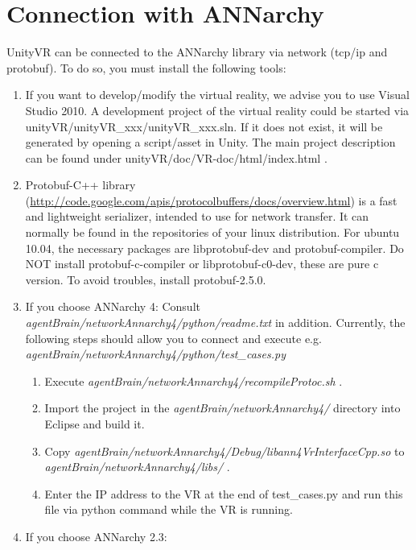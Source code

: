 \documentclass[10pt,final]{scrreprt}
\begin{document}
\section{Connection with ANNarchy}
\label{ConnectionwithANNarchy}

UnityVR can be connected to the ANNarchy library via network (tcp/ip and protobuf). To do so, you must install the following tools: 	

\begin{enumerate}
\item If you want to develop/modify the virtual reality, we advise you to use Visual Studio 2010. A development project of the virtual reality could be started via unityVR/unityVR\_xxx/unityVR\_xxx.sln. If it does not exist, it will be generated by opening a script/asset in Unity. The main project description can be found under unityVR/doc/VR-doc/html/index.html .
\item  Protobuf-C++ library (\url{http://code.google.com/apis/protocolbuffers/docs/overview.html}) is a fast and lightweight serializer, intended to use for network transfer. It can normally be found in the repositories of your linux distribution. For ubuntu 10.04, the necessary packages are libprotobuf-dev and protobuf-compiler. Do NOT install  protobuf-c-compiler or libprotobuf-c0-dev, these are pure c version. To avoid troubles, install protobuf-2.5.0.
\item If you choose ANNarchy 4: Consult \emph{agentBrain/networkAnnarchy4/python/readme.txt} in addition. Currently, the following steps should allow you to connect and execute e.g. \newline \emph{agentBrain/networkAnnarchy4/python/test\_cases.py}
\begin{enumerate}
\item Execute \emph{agentBrain/networkAnnarchy4/recompileProtoc.sh} .
\item Import the project in the \emph{agentBrain/networkAnnarchy4/} directory into Eclipse and build it.
\item Copy \emph{agentBrain/networkAnnarchy4/Debug/libann4VrInterfaceCpp.so} to \emph{agentBrain/networkAnnarchy4/libs/} .
\item Enter the IP address to the VR at the end of \textsf{test\_cases.py} and run this file via python command while the VR is running.
\end{enumerate}
\item If you choose ANNarchy 2.3: 

\end{enumerate}
\end{document}
